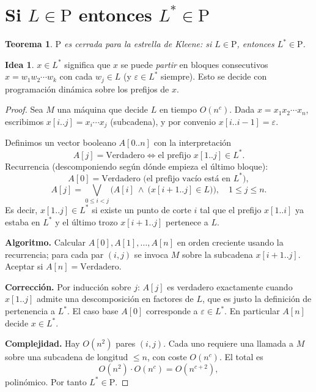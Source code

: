 \documentclass[11pt,a4paper]{article}
\theoremstyle{plain}
\newtheorem{teorema}{Teorema}
\theoremstyle{definition}
\newtheorem*{idea}{Idea}
\newcommand{\Pclass}{\mathrm{P}}
\newcommand{\Lstar}{L^{*}}
\begin{document}
\section{Si $L\in\Pclass$ entonces $\Lstar\in\Pclass$}

\begin{teorema}
$\Pclass$ es cerrada para la estrella de Kleene: si $L\in\Pclass$, entonces
$\Lstar\in\Pclass$.
\end{teorema}

\begin{idea}
$x\in\Lstar$ significa que $x$ se puede \emph{partir} en bloques consecutivos
$x=w_1 w_2\cdots w_k$ con cada $w_j\in L$ (y $\varepsilon\in\Lstar$ siempre). Esto se
decide con programaci\'on din\'amica sobre los prefijos de $x$.
\end{idea}

\begin{proof}
Sea $M$ una m\'aquina que decide $L$ en tiempo $O(n^{c})$. Dada
$x=x_1 x_2\cdots x_n$, escribimos $x[i..j]=x_i\cdots x_j$ (subcadena), y por convenio
$x[i..i-1]=\varepsilon$.

Definimos un vector booleano $A[0..n]$ con la interpretaci\'on
\[
A[j] = \text{Verdadero} \iff \text{el prefijo } x[1..j]\in\Lstar .
\]
Recurrencia (descomponiendo seg\'un d\'onde empieza el \'ultimo bloque):
\[
A[0]=\text{Verdadero (el prefijo vac\'io est\'a en }\Lstar),
\]
\[
A[j]=\bigvee_{0\le i<j}\Big(A[i]\ \wedge\ \big(x[i+1..j]\in L\big)\Big),
\quad 1\le j\le n .
\]
Es decir, $x[1..j]\in\Lstar$ si existe un punto de corte $i$ tal que el prefijo
$x[1..i]$ ya estaba en $\Lstar$ y el \'ultimo trozo $x[i+1..j]$ pertenece a $L$.

\textbf{Algoritmo.} Calcular $A[0],A[1],\dots,A[n]$ en orden creciente usando la
recurrencia; para cada par $(i,j)$ se invoca $M$ sobre la subcadena $x[i+1..j]$.
Aceptar si $A[n]=\text{Verdadero}$.

\textbf{Correcci\'on.} Por inducci\'on sobre $j$: $A[j]$ es verdadero exactamente
cuando $x[1..j]$ admite una descomposici\'on en factores de $L$, que es justo la
definici\'on de pertenencia a $\Lstar$. El caso base $A[0]$ corresponde a
$\varepsilon\in\Lstar$. En particular $A[n]$ decide $x\in\Lstar$.

\textbf{Complejidad.} Hay $O(n^{2})$ pares $(i,j)$. Cada uno requiere una llamada a
$M$ sobre una subcadena de longitud $\le n$, con coste $O(n^{c})$. El total es
\[
O(n^{2})\cdot O(n^{c}) = O(n^{c+2}),
\]
polin\'omico. Por tanto $\Lstar\in\Pclass$.
\end{proof}
\end{document}
